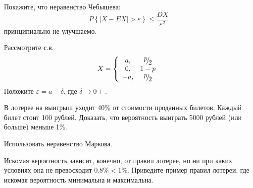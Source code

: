 \begin{problem}
Покажите, что неравенство Чебышева:
\[P\left\{\left|X-EX\right|>\varepsilon \right\}\le \frac{DX}{\varepsilon ^{2} } \] 
принципиально не улучшаемо.

\begin{ordre} 
Рассмотрите с.в. 
\[X=\left\{\begin{array}{cc} {a,} & {{\raise0.7ex\hbox{$ p $}\!\mathord{\left/ {\vphantom {p 2}} \right. \kern-\nulldelimiterspace}\!\lower0.7ex\hbox{$ 2 $}} } \\ {0,} & {1-p} \\ {-a,} & {{\raise0.7ex\hbox{$ p $}\!\mathord{\left/ {\vphantom {p 2}} \right. \kern-\nulldelimiterspace}\!\lower0.7ex\hbox{$ 2 $}} } \end{array}\right. \] 
Положите $\varepsilon =a-\delta $, где $\delta \to 0+$.
\end{ordre}

\end{problem}

\begin{problem}

 В лотерее на выигрыш уходит 40\% от стоимости проданных билетов. Каждый билет стоит 100 рублей. Доказать, что вероятность выиграть 5000 рублей (или больше) меньше 1\%.

\begin{ordre} 
Использовать неравенство Маркова.
\end{ordre}

Искомая вероятность зависит, конечно, от правил лотерее, но ни при каких условиях она не превосходит 0.8\%$<$1\%.
Приведите пример правил лотереи, где искомая вероятность минимальна и максимальна.

\end{problem}

\begin{comment}
\begin{problem}

Покажите, что все моменты распределения

 $p_{\lambda } \left(x\right)=\frac{1}{24} e^{-x^{{1\mathord{\left/ {\vphantom {1 4}} \right. \kern-\nulldelimiterspace} 4} } } \left(1-\lambda \sin x^{{1\mathord{\left/ {\vphantom {1 4}} \right. \kern-\nulldelimiterspace} 4} } \right)$, $x\ge 0$ при любом значении параметра $\lambda \in \left[0,1\right]$ совпадают.

\begin{remark}

Необходимое и достаточное условие того, чтобы моменты однозначно определяли распределение, вообще говоря, комплексной случайной величины $x$, имеет вид:

\noindent $\sum _{n=0}^{\infty }\left(M\left(\left|x\right|^{2n} \right)\right)^{{-1\mathord{\left/ {\vphantom {-1 \left(2n\right)}} \right. \kern-\nulldelimiterspace} \left(2n\right)} } =\infty  $ (условие Карлемана).
\end{remark}

\end{problem} 
\end{comment}

